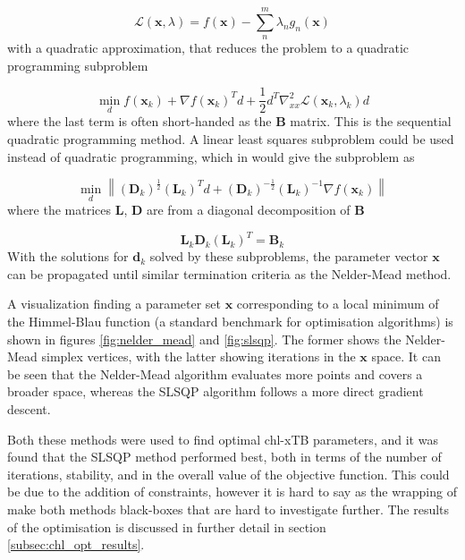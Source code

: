 \begin{equation}
\mathcal{L} \left(\mathbf{x}, \lambda\right) = f\left(\mathbf{x}\right) - \sum^m_n \lambda_n g_n \left( \mathbf{x}\right)
\end{equation}
%
with a quadratic approximation, that reduces the problem to a quadratic programming
subproblem

\begin{equation}
\min_d f\left(\mathbf{x}_k\right) + \nabla f\left(\mathbf{x}_k\right)^T d + \frac{1}{2}d^T \nabla^2_{xx} \mathcal{L} \left(\mathbf{x}_k, \lambda_k \right) d
\end{equation}
%
where the last term is often short-handed as the $\mathbf{B}$ matrix. This is the 
sequential quadratic programming method. A linear least squares subproblem could
be used instead of quadratic programming, which in would give the subproblem as

\begin{equation}
\min_d \left\| \left(\mathbf{D}_k\right)^{\frac{1}{2}} \left(\mathbf{L}_k\right)^T d + \left(\mathbf{D}_k\right)^{-\frac{1}{2}}\left(\mathbf{L}_k\right)^{-1}\nabla f \left(\mathbf{x}_k\right)\right\|
\end{equation}
%
where the matrices $\mathbf{L}$, $\mathbf{D}$ are from a diagonal decomposition 
of $\mathbf{B}$

\begin{equation}
\mathbf{L}_k \mathbf{D}_k \left(\mathbf{L}_k\right)^T = \mathbf{B}_k
\end{equation}
%
With the solutions for $\mathbf{d}_k$ solved by these subproblems, the parameter 
vector $\mathbf{x}$ can be propagated until similar termination criteria as the 
Nelder-Mead method.

A visualization finding a parameter set $\mathbf{x}$ corresponding to a local minimum
of the Himmel-Blau function \cite{Himmelblau1972} (a standard benchmark for optimisation 
algorithms) is shown in figures \ref{fig:nelder_mead} and \ref{fig:slsqp}. The former 
shows the Nelder-Mead simplex vertices, with the latter showing iterations in the 
$\mathbf{x}$ space. It can be seen that the Nelder-Mead algorithm evaluates more
points and covers a broader space, whereas the SLSQP algorithm follows a more direct
gradient descent. 

Both these methods were used to find optimal chl-xTB parameters, and it was found 
that the SLSQP method performed best, both in terms of the number of iterations,
stability, and in the overall value of the objective function. This could be due 
to the addition of constraints, however it is hard to say as the wrapping of 
make both methods black-boxes that are hard to investigate further. The results
of the optimisation is discussed in further detail in section \ref{subsec:chl_opt_results}.

